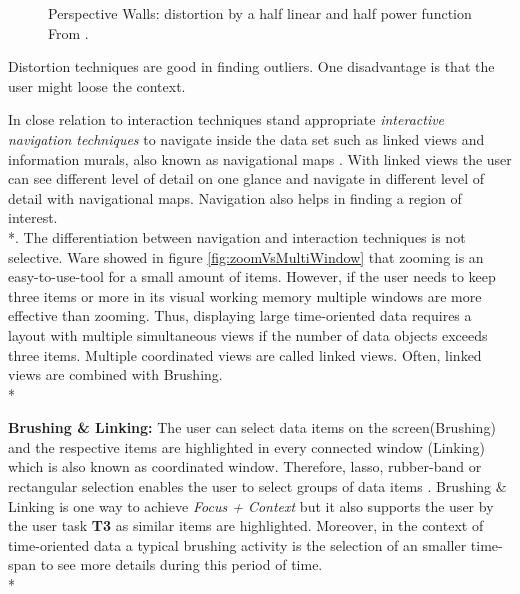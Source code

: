 \begin{figure}[H]
    \centering
    \caption{Perspective Walls: distortion by a half linear and half power function From  \cite{Stroe1999}.}
    \label{fig:perspectivewall}
\end{figure}
Distortion techniques are good in finding outliers. One disadvantage is that the user might loose the context.
\par

\label{navigation}
In close relation to interaction techniques stand appropriate \textit{interactive navigation techniques} to navigate inside the data set such as linked views and information murals, also known as navigational maps  \cite{Jerding1998}. With linked views the user can see different level of detail on one glance and navigate in different level of detail with navigational maps. Navigation also helps in finding a region of interest.\\*. The differentiation between navigation and interaction techniques is not selective.
\label{zoomingVsmultiple}
Ware  \cite{Ware2012} showed in figure \ref{fig:zoomVsMultiWindow} that zooming is an easy-to-use-tool for a small amount of items. However, if the user needs to keep three items or more in its visual working memory multiple windows are more effective than zooming. Thus, displaying large time-oriented data requires a layout with multiple simultaneous views if the number of data objects exceeds three items. Multiple coordinated views are called linked views. Often, linked views are combined with Brushing. \\*

\textbf{Brushing \& Linking: }The user can select data items on the screen(Brushing) and the respective items are highlighted in every connected window (Linking) which is also known as coordinated window. Therefore, lasso, rubber-band or rectangular selection enables the user to select groups of data items  \cite{Tegarden1999, Aigner2011}. Brushing \& Linking is one way to achieve \textit{Focus + Context} but it also supports the user by the user task \textbf{T3} as similar items are highlighted. Moreover, in the context of time-oriented data a typical brushing activity is the selection of an smaller time-span to see more details during this period of time. 
\\*


